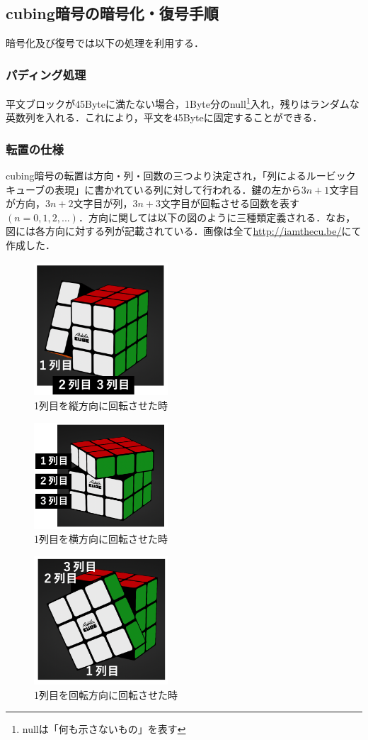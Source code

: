 \documentclass[titlepage]{jarticle}
\begin{document}
\subsection{cubing暗号の暗号化・復号手順}
暗号化及び復号では以下の処理を利用する．

\subsubsection{パディング処理}
平文ブロックが45Byteに満たない場合，1Byte分のnull\footnote{nullは「何も示さないもの」を表す}入れ，残りはランダムな英数列を入れる．これにより，平文を45Byteに固定することができる．

\subsubsection{転置の仕様}
cubing暗号の転置は方向・列・回数の三つより決定され，「列によるルービックキューブの表現」に書かれている列に対して行われる．鍵の左から\(3n+1\)文字目が方向，\(3n+2\)文字目が列，\(3n+3\)文字目が回転させる回数を表す\((n=0,1,2,...)\)．方向に関しては以下の図のように三種類定義される．なお，図には各方向に対する列が記載されている．画像は全て\url{http://iamthecu.be/}にて作成した．

\begin{figure}[htb]
  \centering
  \includegraphics[width=5cm]{./tex_pic/tate.jpg}
  \caption{1列目を縦方向に回転させた時}
\end{figure}
\begin{figure}[htb]
  \centering
  \includegraphics[width=5cm]{./tex_pic/yoko.jpg}
  \caption{1列目を横方向に回転させた時}
\end{figure}
\begin{figure}[!h]
  \centering
  \includegraphics[width=5cm]{./tex_pic/kai.jpg}
  \caption{1列目を回転方向に回転させた時}
\end{figure}
\end{document}
